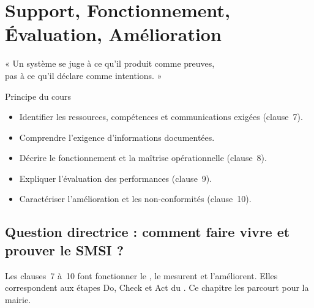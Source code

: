 
\chapter{Support, Fonctionnement, Évaluation, Amélioration}
\label{chap:clauses710}

\epigraph{%
    « Un système se juge à ce qu'il produit comme preuves,\\
    pas à ce qu'il déclare comme intentions. »%
}{Principe du cours}


\begin{boxobjectifs}
\begin{itemize}
    \item Identifier les ressources, compétences et communications exigées
          (clause~7).
    \item Comprendre l'exigence d'informations documentées.
    \item Décrire le fonctionnement et la maîtrise opérationnelle (clause~8).
    \item Expliquer l'évaluation des performances (clause~9).
    \item Caractériser l'amélioration et les non-conformités (clause~10).
\end{itemize}
\end{boxobjectifs}

\bigskip

\section*{Question directrice : comment faire vivre et prouver le SMSI ?}

Les clauses~7 à~10 font fonctionner le , le mesurent et
l'améliorent. Elles correspondent aux étapes Do, Check et Act du
. Ce chapitre les parcourt pour la mairie.

